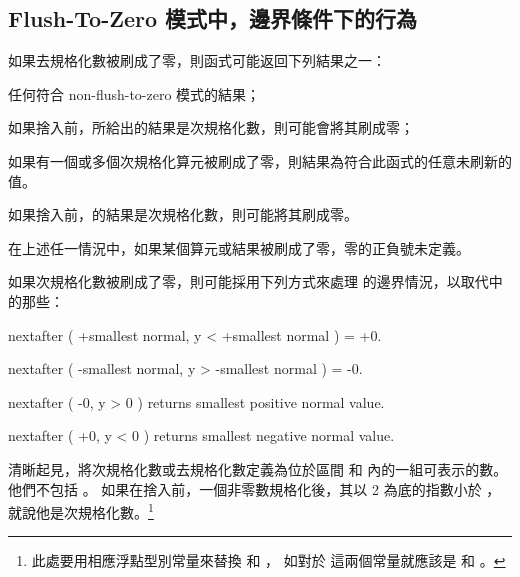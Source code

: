 \subsection[sec:ftzmECB]{Flush-To-Zero 模式中，邊界條件下的行為}

如果去規格化數被刷成了零，則函式可能返回下列結果之一：
\startigNum
\item[item:nftz]任何符合 non-flush-to-zero 模式的結果；

\item 如果捨入前，所給出的結果是次規格化數，則可能會將其刷成零；

\item[item:nfcr] 如果有一個或多個次規格化算元被刷成了零，則結果為符合此函式的任意未刷新的值。

\item 如果捨入前，的結果是次規格化數，則可能將其刷成零。
\stopigNum

在上述任一情況中，如果某個算元或結果被刷成了零，零的正負號未定義。

如果次規格化數被刷成了零，則可能採用下列方式來處理 
的邊界情況，以取代中的那些：

nextafter ( +smallest normal, y < +smallest normal ) = +0.\par
nextafter ( -smallest normal, y > -smallest normal ) = -0.\par
nextafter ( -0, y > 0 ) returns smallest positive normal value.\par
nextafter ( +0, y < 0 ) returns smallest negative normal value.\par

清晰起見，將次規格化數或去規格化數定義為位於區間 
和  內的一組可表示的數。
他們不包括 。
如果在捨入前，一個非零數規格化後，其以 2 為底的指數小於 ，
就說他是次規格化數。\footnote{%
此處要用相應浮點型別常量來替換  和 ，
如對於  這兩個常量就應該是  和 。}


